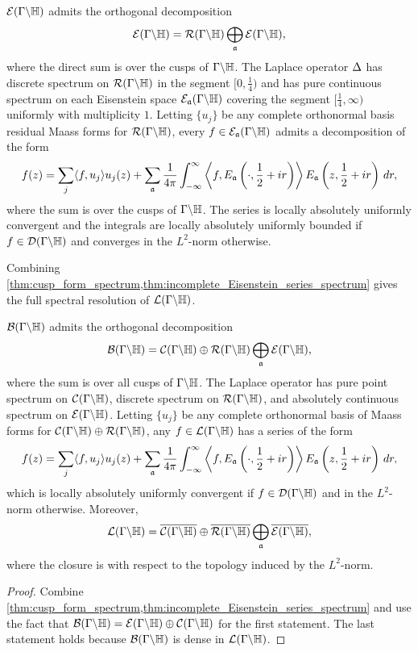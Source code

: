       \begin{theorem}\label{thm:incomplete_Eisenstein_series_spectrum}
        $\mathcal{E}(\Gamma\backslash\mathbb{H})$ admits the orthogonal decomposition
        \[
          \mathcal{E}(\Gamma\backslash\mathbb{H}) = \mathcal{R}(\Gamma\backslash\mathbb{H}) \bigoplus_{\mathfrak{a}}\mathcal{E}(\Gamma\backslash\mathbb{H}),
        \]
        where the direct sum is over the cusps of $\Gamma\backslash\mathbb{H}$. The Laplace operator $\Delta$ has discrete spectrum on $\mathcal{R}(\Gamma\backslash\mathbb{H})$ in the segment $[0,\frac{1}{4})$ and has pure continuous spectrum on each Eisenstein space $\mathcal{E}_{\mathfrak{a}}(\Gamma\backslash\mathbb{H})$ covering the segment $\big[\frac{1}{4},\infty\big)$ uniformly with multiplicity $1$. Letting $\{u_{j}\}$ be any complete orthonormal basis residual Maass forms for $\mathcal{R}(\Gamma\backslash\mathbb{H})$, every $f \in \mathcal{E}_{\mathfrak{a}}(\Gamma\backslash\mathbb{H})$ admits a decomposition of the form
        \[
          f(z) = \sum_{j}\langle f,u_{j}\rangle u_{j}(z)+\sum_{\mathfrak{a}}\frac{1}{4\pi}\int_{-\infty}^{\infty}\left\langle f,E_{\mathfrak{a}}\left(\cdot,\frac{1}{2}+ir\right)\right\rangle E_{\mathfrak{a}}\left(z,\frac{1}{2}+ir\right)\,dr,
        \]
        where the sum is over the cusps of $\Gamma\backslash\mathbb{H}$. The series is locally absolutely uniformly convergent and the integrals are locally absolutely uniformly bounded if $f \in \mathcal{D}(\Gamma\backslash\mathbb{H})$ and converges in the $L^{2}$-norm otherwise.
      \end{theorem}

      Combining \cref{thm:cusp_form_spectrum,thm:incomplete_Eisenstein_series_spectrum} gives the full spectral resolution of $\mathcal{L}(\Gamma\backslash\mathbb{H})$.

      \begin{theorem}\label{thm:the_full_spectral_resolution}
        $\mathcal{B}(\Gamma\backslash\mathbb{H})$ admits the orthogonal decomposition
        \[
          \mathcal{B}(\Gamma\backslash\mathbb{H}) = \mathcal{C}(\Gamma\backslash\mathbb{H}) \oplus \mathcal{R}(\Gamma\backslash\mathbb{H}) \bigoplus_{\mathfrak{a}}\mathcal{E}(\Gamma\backslash\mathbb{H}),
        \]
        where the sum is over all cusps of $\Gamma\backslash\mathbb{H}$. The Laplace operator has pure point spectrum on $\mathcal{C}(\Gamma\backslash\mathbb{H})$, discrete spectrum on $\mathcal{R}(\Gamma\backslash\mathbb{H})$, and absolutely continuous spectrum on $\mathcal{E}(\Gamma\backslash\mathbb{H})$. Letting $\{u_{j}\}$ be any complete orthonormal basis of Maass forms for $\mathcal{C}(\Gamma\backslash\mathbb{H}) \oplus \mathcal{R}(\Gamma\backslash\mathbb{H})$, any $f \in \mathcal{L}(\Gamma\backslash\mathbb{H})$ has a series of the form
        \[
          f(z) = \sum_{j}\langle f,u_{j}\rangle u_{j}(z)+\sum_{\mathfrak{a}}\frac{1}{4\pi}\int_{-\infty}^{\infty}\left\langle f,E_{\mathfrak{a}}\left(\cdot,\frac{1}{2}+ir\right)\right\rangle E_{\mathfrak{a}}\left(z,\frac{1}{2}+ir\right)\,dr,
        \]
        which is locally absolutely uniformly convergent if $f \in \mathcal{D}(\Gamma\backslash\mathbb{H})$ and in the $L^{2}$-norm otherwise. Moreover,
        \[
          \mathcal{L}(\Gamma\backslash\mathbb{H}) = \overline{\mathcal{C}(\Gamma\backslash\mathbb{H})} \oplus  \overline{\mathcal{R}(\Gamma\backslash\mathbb{H})} \bigoplus_{\mathfrak{a}}\overline{\mathcal{E}(\Gamma\backslash\mathbb{H})},
        \]
        where the closure is with respect to the topology induced by the $L^{2}$-norm.
      \end{theorem}
      \begin{proof}
        Combine \cref{thm:cusp_form_spectrum,thm:incomplete_Eisenstein_series_spectrum} and use the fact that $\mathcal{B}(\Gamma\backslash\mathbb{H}) = \mathcal{E}(\Gamma\backslash\mathbb{H}) \oplus \mathcal{C}(\Gamma\backslash\mathbb{H})$ for the first statement. The last statement holds because $\mathcal{B}(\Gamma\backslash\mathbb{H})$ is dense in $\mathcal{L}(\Gamma\backslash\mathbb{H})$.
      \end{proof}